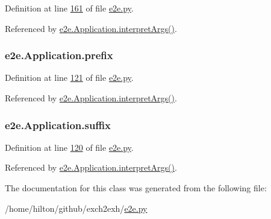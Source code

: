 Definition at line \hyperlink{e2e_8py_source_l00161}{161} of file \hyperlink{e2e_8py_source}{e2e.\+py}.



Referenced by \hyperlink{e2e_8py_source_l00166}{e2e.\+Application.\+interpret\+Args()}.

\subsubsection[{\texorpdfstring{prefix}{prefix}}]{\setlength{\rightskip}{0pt plus 5cm}e2e.\+Application.\+prefix}\hypertarget{classe2e_1_1_application_a027ff25e5409ae17584978a09fc2611a}{}\label{classe2e_1_1_application_a027ff25e5409ae17584978a09fc2611a}


Definition at line \hyperlink{e2e_8py_source_l00121}{121} of file \hyperlink{e2e_8py_source}{e2e.\+py}.



Referenced by \hyperlink{e2e_8py_source_l00166}{e2e.\+Application.\+interpret\+Args()}.

\subsubsection[{\texorpdfstring{suffix}{suffix}}]{\setlength{\rightskip}{0pt plus 5cm}e2e.\+Application.\+suffix}\hypertarget{classe2e_1_1_application_a4d824ad36b051d2d629edb314385df0d}{}\label{classe2e_1_1_application_a4d824ad36b051d2d629edb314385df0d}


Definition at line \hyperlink{e2e_8py_source_l00120}{120} of file \hyperlink{e2e_8py_source}{e2e.\+py}.



Referenced by \hyperlink{e2e_8py_source_l00166}{e2e.\+Application.\+interpret\+Args()}.



The documentation for this class was generated from the following file\+:\begin{DoxyCompactItemize}
\item 
/home/hilton/github/exch2exh/\hyperlink{e2e_8py}{e2e.\+py}\end{DoxyCompactItemize}
